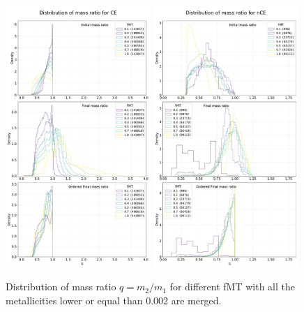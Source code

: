 \documentclass[prb,twocolumn,9pt]{revtex4-1}
\begin{document}
\begin{figure}[htp]
    \centering
    \includegraphics[width=0.49\textwidth]{images/assignment2_1/hist_q_fMT_CE.pdf}
    \hskip 1mm
   \includegraphics[width=0.49\textwidth]{images/assignment2_1/hist_q_fMT_nCE.pdf}
    \caption{Distribution of mass ratio \(q=m_2/m_1\) for different fMT with all the metallicities lower or equal than 0.002 are merged. 
}
\end{figure}
\end{document}
